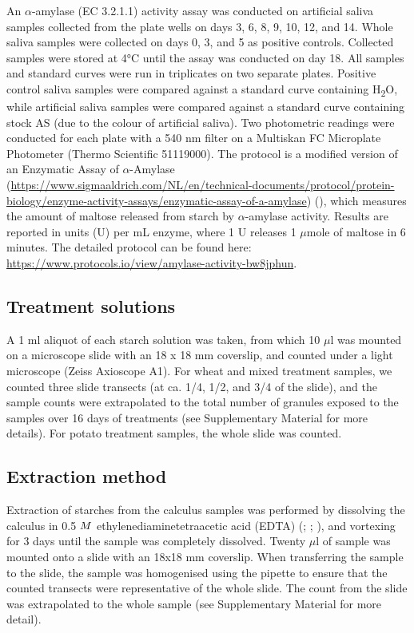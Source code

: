 \documentclass[
  b5paper,
]{book}
\begin{document}
An \(\alpha\)-amylase (EC 3.2.1.1) activity assay was conducted on
artificial saliva samples collected from the plate wells on days 3, 6,
8, 9, 10, 12, and 14. Whole saliva samples were collected on days 0, 3,
and 5 as positive controls. Collected samples were stored at 4°C until
the assay was conducted on day 18. All samples and standard curves were
run in triplicates on two separate plates. Positive control saliva
samples were compared against a standard curve containing
H\textsubscript{2}O, while artificial saliva samples were compared
against a standard curve containing stock AS (due to the colour of
artificial saliva). Two photometric readings were conducted for each
plate with a 540 nm filter on a Multiskan FC Microplate Photometer
(Thermo Scientific 51119000). The protocol is a modified version of an
Enzymatic Assay of \(\alpha\)-Amylase
(\url{https://www.sigmaaldrich.com/NL/en/technical-documents/protocol/protein-biology/enzyme-activity-assays/enzymatic-assay-of-a-amylase})
(), which measures the
amount of maltose released from starch by \(\alpha\)-amylase activity.
Results are reported in units (U) per mL enzyme, where 1 U releases 1
\(\mu\)mole of maltose in 6 minutes. The detailed protocol can be found
here: \url{https://www.protocols.io/view/amylase-activity-bw8jphun}.

\subsection{Treatment solutions}\label{treatment-solutions}

A 1 ml aliquot of each starch solution was taken, from which 10 \(\mu\)l
was mounted on a microscope slide with an 18 x 18 mm coverslip, and
counted under a light microscope (Zeiss Axioscope A1). For wheat and
mixed treatment samples, we counted three slide transects (at ca. 1/4,
1/2, and 3/4 of the slide), and the sample counts were extrapolated to
the total number of granules exposed to the samples over 16 days of
treatments (see Supplementary Material for more details). For potato
treatment samples, the whole slide was counted.

\subsection{Extraction method}\label{extraction-method}

Extraction of starches from the calculus samples was performed by
dissolving the calculus in 0.5 \(\tiny{M}\) ethylenediaminetetraacetic
acid (EDTA) (; ; ),
and vortexing for 3 days until the sample was completely dissolved.
Twenty \(\mu\)l of sample was mounted onto a slide with an 18x18 mm
coverslip. When transferring the sample to the slide, the sample was
homogenised using the pipette to ensure that the counted transects were
representative of the whole slide. The count from the slide was
extrapolated to the whole sample (see Supplementary Material for more
detail).
\end{document}
